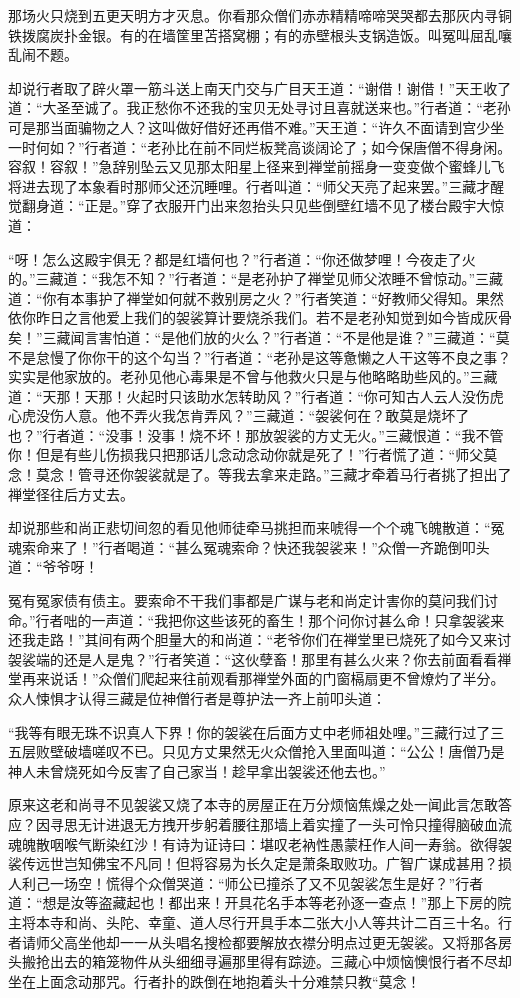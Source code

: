 \documentclass[12pt,UTF8]{ctexbook}
\begin{document}
{那场火只烧到五更天明方才灭息。你看那众僧们赤赤精精啼啼哭哭都去那灰内寻铜铁拨腐炭扑金银。有的在墙筐里苫搭窝棚；有的赤壁根头支锅造饭。叫冤叫屈乱嚷乱闹不题。

却说行者取了辟火罩一筋斗送上南天门交与广目天王道：“谢借！谢借！”天王收了道：“大圣至诚了。我正愁你不还我的宝贝无处寻讨且喜就送来也。”行者道：“老孙可是那当面骗物之人？这叫做好借好还再借不难。”天王道：“许久不面请到宫少坐一时何如？”行者道：“老孙比在前不同烂板凳高谈阔论了；如今保唐僧不得身闲。容叙！容叙！”急辞别坠云又见那太阳星上径来到禅堂前摇身一变变做个蜜蜂儿飞将进去现了本象看时那师父还沉睡哩。行者叫道：“师父天亮了起来罢。”三藏才醒觉翻身道：“正是。”穿了衣服开门出来忽抬头只见些倒壁红墙不见了楼台殿宇大惊道：

“呀！怎么这殿宇俱无？都是红墙何也？”行者道：“你还做梦哩！今夜走了火的。”三藏道：“我怎不知？”行者道：“是老孙护了禅堂见师父浓睡不曾惊动。”三藏道：“你有本事护了禅堂如何就不救别房之火？”行者笑道：“好教师父得知。果然依你昨日之言他爱上我们的袈裟算计要烧杀我们。若不是老孙知觉到如今皆成灰骨矣！”三藏闻言害怕道：“是他们放的火么？”行者道：“不是他是谁？”三藏道：“莫不是怠慢了你你干的这个勾当？”行者道：“老孙是这等惫懒之人干这等不良之事？实实是他家放的。老孙见他心毒果是不曾与他救火只是与他略略助些风的。”三藏道：“天那！天那！火起时只该助水怎转助风？”行者道：“你可知古人云人没伤虎心虎没伤人意。他不弄火我怎肯弄风？”三藏道：“袈裟何在？敢莫是烧坏了也？”行者道：“没事！没事！烧不坏！那放袈裟的方丈无火。”三藏恨道：“我不管你！但是有些儿伤损我只把那话儿念动念动你就是死了！”行者慌了道：“师父莫念！莫念！管寻还你袈裟就是了。等我去拿来走路。”三藏才牵着马行者挑了担出了禅堂径往后方丈去。

却说那些和尚正悲切间忽的看见他师徒牵马挑担而来唬得一个个魂飞魄散道：“冤魂索命来了！”行者喝道：“甚么冤魂索命？快还我袈裟来！”众僧一齐跪倒叩头道：“爷爷呀！

冤有冤家债有债主。要索命不干我们事都是广谋与老和尚定计害你的莫问我们讨命。”行者咄的一声道：“我把你这些该死的畜生！那个问你讨甚么命！只拿袈裟来还我走路！”其间有两个胆量大的和尚道：“老爷你们在禅堂里已烧死了如今又来讨袈裟端的还是人是鬼？”行者笑道：“这伙孽畜！那里有甚么火来？你去前面看看禅堂再来说话！”众僧们爬起来往前观看那禅堂外面的门窗槅扇更不曾燎灼了半分。众人悚惧才认得三藏是位神僧行者是尊护法一齐上前叩头道：

“我等有眼无珠不识真人下界！你的袈裟在后面方丈中老师祖处哩。”三藏行过了三五层败壁破墙嗟叹不已。只见方丈果然无火众僧抢入里面叫道：“公公！唐僧乃是神人未曾烧死如今反害了自己家当！趁早拿出袈裟还他去也。”

原来这老和尚寻不见袈裟又烧了本寺的房屋正在万分烦恼焦燥之处一闻此言怎敢答应？因寻思无计进退无方拽开步躬着腰往那墙上着实撞了一头可怜只撞得脑破血流魂魄散咽喉气断染红沙！有诗为证诗曰：堪叹老衲性愚蒙枉作人间一寿翁。欲得袈裟传远世岂知佛宝不凡同！但将容易为长久定是萧条取败功。广智广谋成甚用？损人利己一场空！慌得个众僧哭道：“师公已撞杀了又不见袈裟怎生是好？”行者道：“想是汝等盗藏起也！都出来！开具花名手本等老孙逐一查点！”那上下房的院主将本寺和尚、头陀、幸童、道人尽行开具手本二张大小人等共计二百三十名。行者请师父高坐他却一一从头唱名搜检都要解放衣襟分明点过更无袈裟。又将那各房头搬抢出去的箱笼物件从头细细寻遍那里得有踪迹。三藏心中烦恼懊恨行者不尽却坐在上面念动那咒。行者扑的跌倒在地抱着头十分难禁只教“莫念！

}
\end{document}
